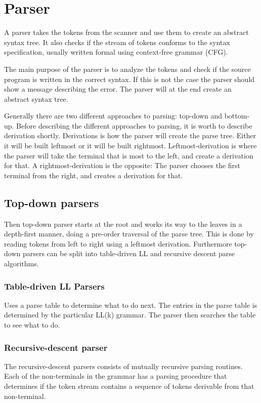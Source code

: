 \section{Parser}
A parser takes the tokens from the scanner and use them to create an abstract syntax tree. It also checks if the stream of tokens conforms to the syntax specification, usually written formal using context-free grammar (CFG).

The main purpose of the parser is to analyze the tokens and check if the source program is written in the correct syntax. If this is not the case the parser should show a message describing the error. The parser will at the end create an abstract syntax tree. 

Generally there are two different approaches to parsing: top-down and bottom-up. Before describing the different approaches to parsing, it is worth to describe derivation shortly. Derivations is how the parser will create the parse tree. Either it will be built leftmost or it will be built rightmost. Leftmost-derivation is where the parser will take the terminal that is most to the left, and create a derivation for that. A rightmost-derivation is the opposite: The parser chooses the first terminal from the right, and creates a derivation for that. 

\subsection{Top-down parsers}
Then top-down parser starts at the root and works its way to the leaves in a depth-first manner, doing a pre-order traversal of the parse tree. This is done by reading tokens from left to right using a leftmost derivation. Furthermore top-down parsers can be split into table-driven LL and recursive descent parse algorithms.

\subsubsection*{Table-driven LL Parsers}
Uses a parse table to determine what to do next. The entries in the parse table is determined by the particular LL(k) grammar. The parser then searches the table to see what to do.

\subsubsection*{Recursive-descent parser}
The recursive-descent parsers consists of mutually recursive parsing routines. Each of the non-terminals in the grammar has a parsing procedure that determines if the token stream contains a sequence of tokens derivable from that non-terminal.

